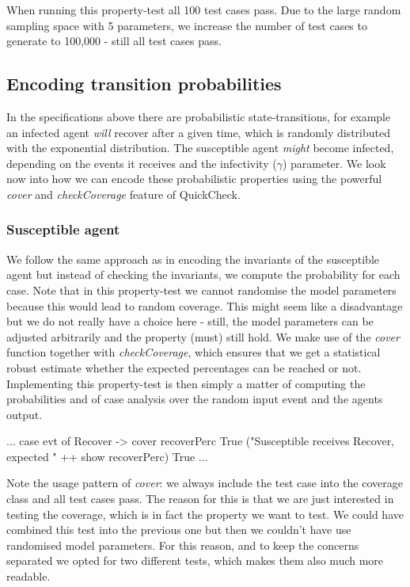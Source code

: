 When running this property-test all 100 test cases pass. Due to the large random sampling space with 5 parameters, we increase the number of test cases to generate to 100,000 - still all test cases pass.

\subsection{Encoding transition probabilities}
In the specifications above there are probabilistic state-transitions, for example an infected agent \textit{will} recover after a given time, which is randomly distributed with the exponential distribution. The susceptible agent \textit{might} become infected, depending on the events it receives and the infectivity ($\gamma$) parameter. We look now into how we can encode these probabilistic properties using the powerful \textit{cover} and \textit{checkCoverage} feature of QuickCheck.

\subsubsection{Susceptible agent}
We follow the same approach as in encoding the invariants of the susceptible agent but instead of checking the invariants, we compute the probability for each case. Note that in this property-test we cannot randomise the model parameters because this would lead to random coverage. This might seem like a disadvantage but we do not really have a choice here - still, the model parameters can be adjusted arbitrarily and the property (must) still hold. %
We make use of the \textit{cover} function together with \textit{checkCoverage}, which ensures that we get a statistical robust estimate whether the expected percentages can be reached or not. Implementing this property-test is then simply a matter of computing the probabilities and of case analysis over the random input event and the agents output.

\begin{HaskellCode}
...
case evt of 
  Recover -> 
    cover recoverPerc True 
     ("Susceptible receives Recover, expected " ++ show recoverPerc) True
...
\end{HaskellCode}

Note the usage pattern of \textit{cover}: we always include the test case into the coverage class and all test cases pass. The reason for this is that we are just interested in testing the coverage, which is in fact the property we want to test. We could have combined this test into the previous one but then we couldn't have use randomised model parameters. For this reason, and to keep the concerns separated we opted for two different tests, which makes them also much more readable.

